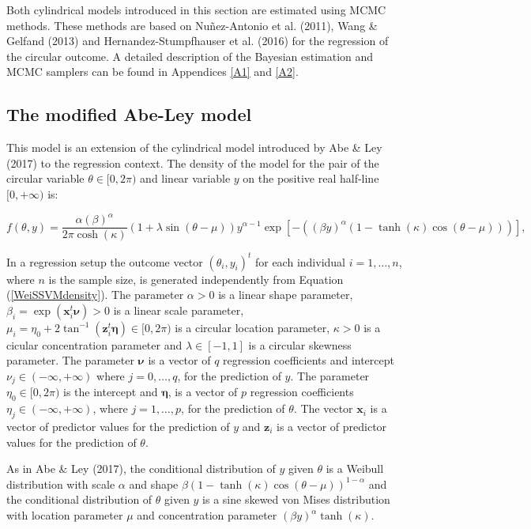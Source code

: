 \documentclass[11pt,]{article}
\begin{document}
Both cylindrical models introduced in this section are estimated using
MCMC methods. These methods are based on Nuñez-Antonio et al. (2011),
Wang \& Gelfand (2013) and Hernandez-Stumpfhauser et al. (2016) for the
regression of the circular outcome. A detailed description of the
Bayesian estimation and MCMC samplers can be found in Appendices
\ref{A1} and \ref{A2}.

\subsection{The modified Abe-Ley model}\label{WeiSSVM}

This model is an extension of the cylindrical model introduced by Abe \&
Ley (2017) to the regression context. The density of the model for the
pair of the circular variable \(\theta \in [0, 2\pi)\) and linear
variable \(y\) on the positive real half-line \([0, + \infty)\) is:

\begin{equation}\label{WeiSSVMdensity}
f(\theta, y) = \frac{\alpha(\beta)^\alpha}{2\pi\cosh(\kappa)}
                 (1 +\lambda\sin(\theta - \mu))
                 y^{\alpha-1}
                 \exp[-((\beta y)^{\alpha}(1-\tanh(\kappa)\cos(\theta - \mu)))],
\end{equation}

In a regression setup the outcome vector \((\theta_i, y_i)^t\) for each
individual \(i = 1, \dots, n\), where \(n\) is the sample size, is
generated independently from Equation (\ref{WeiSSVMdensity}). The
parameter \(\alpha > 0\) is a linear shape parameter,
\(\beta_i = \exp(\boldsymbol{x}_i^t\boldsymbol{\nu}) > 0\) is a linear
scale parameter,
\(\mu_i = \eta_0 + 2\tan^{-1}(\boldsymbol{z}_i^t\boldsymbol{\eta}) \in [0, 2\pi)\)
is a circular location parameter, \(\kappa > 0\) is a cicular
concentration parameter and \(\lambda \in [-1, 1]\) is a circular
skewness parameter. The parameter \(\boldsymbol{\nu}\) is a vector of
\(q\) regression coefficients and intercept
\(\nu_j \in (-\infty, +\infty)\) where \(j = 0, \dots, q\), for the
prediction of \(y\). The parameter \(\eta_0 \in [0, 2\pi)\) is the
intercept and \(\boldsymbol{\eta}\), is a vector of \(p\) regression
coefficients \(\eta_j \in (-\infty, +\infty)\), where
\(j = 1, \dots, p\), for the prediction of \(\theta\). The vector
\(\boldsymbol{x}_i\) is a vector of predictor values for the prediction
of \(y\) and \(\boldsymbol{z}_i\) is a vector of predictor values for
the prediction of \(\theta\).

As in Abe \& Ley (2017), the conditional distribution of \(y\) given
\(\theta\) is a Weibull distribution with scale \(\alpha\) and shape
\(\beta(1-\tanh(\kappa)\cos(\theta - \mu))^{1-\alpha}\) and the
conditional distribution of \(\theta\) given \(y\) is a sine skewed von
Mises distribution with location parameter \(\mu\) and concentration
parameter \((\beta y)^\alpha\tanh(\kappa)\).
\end{document}
